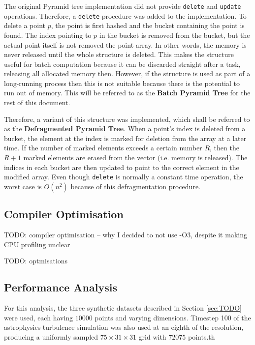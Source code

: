 The original Pyramid tree implementation did not provide \texttt{delete} and \texttt{update} operations. Therefore, a \texttt{delete} procedure was added to the implementation. To delete a point $p$, the point is first hashed and the bucket containing the point is found. The index pointing to $p$ in the bucket is removed from the bucket, but the actual point itself is not removed the point array. In other words, the memory is never released until the whole structure is deleted. This makes the structure useful for batch computation because it can be discarded straight after a task, releasing all allocated memory then. However, if the structure is used as part of a long-running process then this is not suitable because there is the potential to run out of memory. This will be referred to as the \textbf{Batch Pyramid Tree} for the rest of this document.

Therefore, a variant of this structure was implemented, which shall be referred to as the \textbf{Defragmented Pyramid Tree}. When a point's index is deleted from a bucket, the element at the index is marked for deletion from the array at a later time. If the number of marked elements exceeds a certain number $R$, then the $R + 1$ marked elements are erased from the vector (i.e. memory is released). The indices in each bucket are then updated to point to the correct element in the modified array. Even though \texttt{delete} is normally a constant time operation, the worst case is $O(n^2)$ because of this defragmentation procedure.

\subsection{Compiler Optimisation}

TODO: compiler optimisation -- why I decided to not use -O3, despite it making CPU profiling unclear

TODO: optmisations 

\subsection{Performance Analysis}

For this analysis, the three synthetic datasets described in Section \ref{sec:TODO} were used, each having $10000$ points and varying dimensions. Timestep 100 of the astrophysics turbulence simulation was also used at an eighth of the resolution, producing a uniformly sampled $75 \times 31 \times 31$ grid with $72075$ points.th

